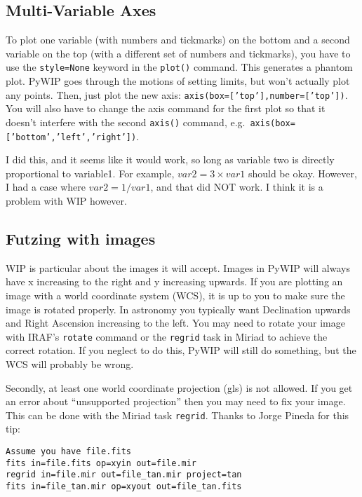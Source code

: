 \documentclass[12pt]{article}
\newcommand{\pywip}{PyWIP}
\begin{document}
\subsection{Multi-Variable Axes}

To plot one variable (with numbers and tickmarks) on the bottom and a second
variable  on the top (with a different set of numbers and tickmarks), you
have to use the \texttt{style=None} keyword in the \texttt{plot()} command.
This generates a phantom plot.  \pywip{} goes through the motions of setting
limits, but won't actually plot any points.  Then, just plot the new axis:
\texttt{axis(box=['top'],number=['top'])}.  You will also have to change the 
axis command for the first plot so that it doesn't interfere with the second
\texttt{axis()} command, e.g.\ \texttt{axis(box=['bottom','left','right'])}.

I did this, and it seems like it would work, so long as variable two is 
directly proportional to variable1.  For example, $var2 = 3\times var1$ should
be okay.  However, I had a case where $var2 = 1/var1$, and that did NOT work.
I think it is a problem with WIP however.

\subsection{\label{sec:futz-images}Futzing with images}

WIP is particular about the images it will accept. Images in \pywip{} will
always have x increasing to the right and y increasing upwards.  If you are
plotting an image with a world coordinate system (WCS), it is up to you to make
sure the image is rotated properly.  In astronomy you typically want Declination
upwards and Right Ascension increasing to the left.  You may need to rotate your
image with IRAF's \texttt{rotate} command or the \texttt{regrid} task in Miriad
to achieve the correct rotation.  If you neglect to do this, \pywip{} will still
do something, but the WCS will probably be wrong.

Secondly, at least one world coordinate projection (gls) is not allowed.  If
you get an error about ``unsupported projection'' then you may need to fix your
image.  This can be done with the Miriad task \texttt{regrid}.  Thanks to 
Jorge Pineda for this tip:
\begin{verbatim}
Assume you have file.fits
fits in=file.fits op=xyin out=file.mir
regrid in=file.mir out=file_tan.mir project=tan
fits in=file_tan.mir op=xyout out=file_tan.fits
\end{verbatim}
\end{document}
